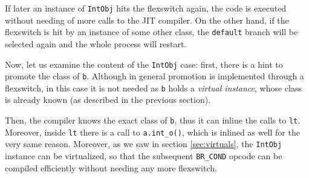 If later an instance of \lstinline{IntObj} hits the flexswitch again, the
code is executed without needing of more calls to the JIT compiler.  On the
other hand, if the flexswitch is hit by an instance of some other class, the
\lstinline{default} branch will be selected again and the whole process will
restart.

Now, let us examine the content of the \lstinline{IntObj} case: first, there
is a hint to promote the class of \lstinline{b}.  Although in general
promotion is implemented through a flexswitch, in this case it is not needed
as \lstinline{b} holds a \emph{virtual instance}, whose class is already
known (as described in the previous section).

Then, the compiler knows the exact class of \lstinline{b}, thus it can inline
the calls to \lstinline{lt}.  Moreover, inside \lstinline{lt} there is a
call to \lstinline{a.int_o()}, which is inlined as well for the very same
reason.  Moreover, as we saw in section \ref{sec:virtuals}, the \lstinline{IntObj}
instance can be virtualized, so that the subsequent \lstinline{BR_COND} opcode
can be compiled efficiently without needing any more flexswitch.

